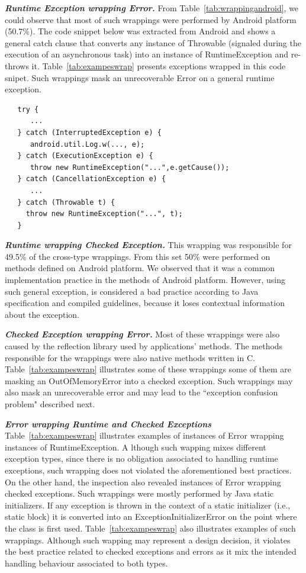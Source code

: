 \documentclass[conference]{IEEEtran}
\begin{document}
\emph{\textbf{Runtime Exception wrapping Error.}} From Table~\ref{tab:wrappingandroid}, we could observe that most of such wrappings
were performed by Android platform (50.7\%).
The code snippet below was extracted from Android and shows a general catch clause 
that converts any instance of Throwable (signaled during the execution
of an asynchronous task) into an instance of RuntimeException and re-throws it.  
Table~\ref{tab:exampeswrap} presents exceptions wrapped in this code snipet.  
Such wrappings mask an unrecoverable Error on a general runtime exception.

{\footnotesize
\begin{verbatim}
   try {
      ...
   } catch (InterruptedException e) {
      android.util.Log.w(..., e);
   } catch (ExecutionException e) {
      throw new RuntimeException("...",e.getCause());
   } catch (CancellationException e) {
      ...
   } catch (Throwable t) {
     throw new RuntimeException("...", t);
   }
\end{verbatim}
}

\emph{\textbf{Runtime wrapping Checked Exception.}} This wrapping was responsible for 49.5\% of
the cross-type wrappings.  From this set 50\%  were performed on methods defined on Android platform. 
We observed that it was a common implementation practice in the methods of Android platform.
However, using such general exception, is considered a bad practice according to Java specification 
and compiled guidelines, because it loses contextual information about the exception.

\emph{\textbf{Checked Exception wrapping Error.}} Most of these wrappings
 were also caused by the reflection library used by applications' methods. The methods responsible for the wrappings
were also native methods written in C. Table~\ref{tab:exampeswrap} illustrates
some of these wrappings some of them are masking an OutOfMemoryError
into a checked exception. Such wrappings may also mask an unrecoverable error
and may lead to the ``exception confusion problem" described next.

\emph{\textbf{Error wrapping Runtime and Checked Exceptions}} Table~\ref{tab:exampeswrap}  illustrates
examples of instances of Error wrapping instances of RuntimeException. A
lthough such wapping mixes different exception types,
since there is no obligation associated to handling runtime exceptions, such wrapping 
does not violated the aforementioned best practices. On the other hand, the inspection 
also revealed instances of Error wrapping checked exceptions. Such wrappings were 
mostly performed by Java static initializers. If any exception is thrown in the context of a static initializer 
(i.e., static block)  it is converted into an ExceptionInitializerError 
on the point where the class is first used.  Table~\ref{tab:exampeswrap} also illustrates
examples of such wrappings. Although such wapping may represent a design decision,
it violates the best practice related to checked exceptions and errors as it mix the intended handling 
behaviour associated to both types.
\end{document}
